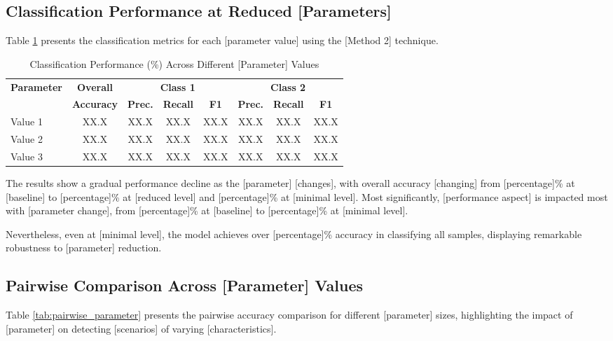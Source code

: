 \subsection{Classification Performance at Reduced [Parameters]}

Table \ref{tab:parameter_performance} presents the classification metrics for each [parameter value] using the [Method 2] technique.

\begin{table}[htbp]
\caption{Classification Performance (\%) Across Different [Parameter] Values}
\label{tab:parameter_performance}
\setlength{\tabcolsep}{5pt}
\centering
  \begin{tabular}{|l|c|c|c|c|c|c|c|}
  \hline
  \multirow{2}{*}{\textbf{Parameter}} & \textbf{Overall} & \multicolumn{3}{c|}{\textbf{Class 1}} & \multicolumn{3}{c|}{\textbf{Class 2}} \\
  \cline{3-8}
   & \textbf{Accuracy} & \textbf{Prec.} & \textbf{Recall} & \textbf{F1} & \textbf{Prec.} & \textbf{Recall} & \textbf{F1} \\
  \hline
  Value 1 & XX.X & XX.X & XX.X & XX.X & XX.X & XX.X & XX.X \\
  \hline
  Value 2 & XX.X & XX.X & XX.X & XX.X & XX.X & XX.X & XX.X \\
  \hline
  Value 3 & XX.X & XX.X & XX.X & XX.X & XX.X & XX.X & XX.X \\
  \hline
  \end{tabular}
\end{table}

The results show a gradual performance decline as the [parameter] [changes], with overall accuracy [changing] from [percentage]\% at [baseline] to [percentage]\% at [reduced level] and [percentage]\% at [minimal level]. Most significantly, [performance aspect] is impacted most with [parameter change], from [percentage]\% at [baseline] to [percentage]\% at [minimal level].

Nevertheless, even at [minimal level], the model achieves over [percentage]\% accuracy in classifying all samples, displaying remarkable robustness to [parameter] reduction.

\subsection{Pairwise Comparison Across [Parameter] Values}

Table \ref{tab:pairwise_parameter} presents the pairwise accuracy comparison for different [parameter] sizes, highlighting the impact of [parameter] on detecting [scenarios] of varying [characteristics].

